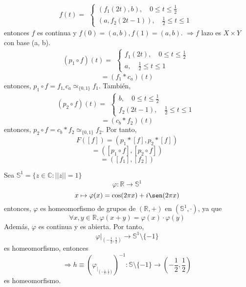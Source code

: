 \begin{dem}
\begin{itemize}
      \[ 
        f(t)  =
        \begin{aligned}
          \begin{cases}
            (f_{1}(2t), b), \quad 0 \leq t \leq \frac{1}{2} \\
            (a, f_{2}(2t - 1)), \quad \frac{1}{2} \leq t \leq 1
          \end{cases}
        \end{aligned} 
      \] 
      entonces $f$ es continua y $f(0) = (a, b), f(1) = (a, b)$.
      $\Rightarrow f$ lazo es $X \times Y$ con base (a, b).
      \[ 
        (p_{1} \circ f)(t)  =
        \begin{aligned}
          \begin{cases}
            f_{1}(2t), \quad 0 \leq t \leq \frac{1}{2} \\
            a, \quad \frac{1}{2} \leq t \leq 1
          \end{cases}
        \end{aligned} 
      \] 
      \[ 
        = (f_{1} * c_{a})(t)
      \] 
      entonces, $p_{1} \circ f = f_{1}_* c_{a} \simeq_{\{ 0, 1 \}} f_{1}$. También,
      \[ 
        (p_{2} \circ f)(t)  =
        \begin{aligned}
          \begin{cases}
            b, \quad 0 \leq t \leq \frac{1}{2} \\
            f_{2}(2t - 1), \quad \frac{1}{2} \leq t \leq 1
          \end{cases}
        \end{aligned}
      \] 
      \[ 
        = (c_{b} * f_{2})(t) 
      \] 
      entonces, $p_{2} \circ f = c_{b} * f_{2} \simeq_{\{ 0, 1 \}} f_{2}$. Por tanto,
      \[ 
        F([f]) = (p_{1} * [f], p_{2} * [f]) 
      \] 
      \[ 
        = ([p_{1} \circ f], [p_{2} \circ f]) 
      \] 
      \[ 
        = ([f_{1}], [f_{2}]) 
      \] 
  \end{itemize}
\end{dem}

\begin{obs}
  Sea $\mathbb{S}^{1} = \{ z \in \mathbb{C} : ||z|| = 1 \}$
  \[ 
    \varphi : \mathbb{R} \to \mathbb{S}^{1} 
  \] 
  \[ 
    x \mapsto \varphi(x) = \cos(2 \pi x) + i \sen(2 \pi x) 
  \] 
  entonces, $\varphi$ es homeomorfismo de grupos de $(\mathbb{R}, +)$ en $(\mathbb{S}^{1}, \cdot)$, ya que
  \[ 
    \forall x, y \in \mathbb{R}, \varphi(x + y) = \varphi(x) \cdot \varphi(y)
  \] 
  Además, $\varphi$ es continua y es abierta. Por tanto,
  \[ 
    \varphi|_{(-\frac{1}{2}, \frac{1}{2})} \to \mathbb{S}^{1}\setminus \{ -1 \}
  \] 
  es homeomorfismo, entonces
  \[ 
    \Rightarrow h \equiv (\varphi_|_{(-\frac{1}{2}, \frac{1}{2})})^{-1} : \mathbb{S}\setminus \{ -1 \} \to (-\frac{1}{2}, \frac{1}{2})
  \] 
  es homeomorfismo.
\end{obs}
